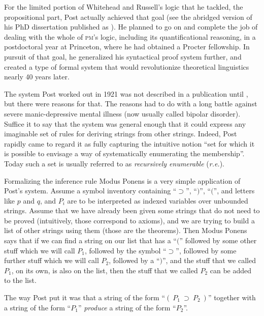 \documentclass[output=paper]{langscibook}
\begin{document}
For the limited portion of  Whitehead and Russell's logic that he tackled, the propositional part, Post actually achieved that goal (see the abridged version of his PhD dissertation published as \citealt{Post21}). He planned to go on and complete the job of dealing with the whole of \textsc{pm}'s logic, including its quantificational reasoning, in a postdoctoral year at Princeton, where he had obtained a Procter fellowship. In pursuit of that goal, he generalized his syntactical proof system further, and created a type of formal system that would revolutionize theoretical linguistics nearly 40 years later.

The system Post worked out in 1921 was not described in a publication until \citeyear{Post43}, but there were reasons for that. The reasons had to do with a long battle against severe manic-depressive mental illness (now usually called bipolar disorder). Suffice it to say that the system was general enough that it could express any imaginable set of rules for deriving strings from other strings. Indeed, Post rapidly came to regard it as fully capturing the intuitive notion ``set for which it is possible to envisage a way of systematically enumerating the membership''. Today such a set is usually referred to as \emph{recursively enumerable} (\emph{r.e.}).

Formalizing the inference rule Modus Ponens is a very simple application of Post's system. Assume a symbol inventory containing ``$\supset$'', ``$)$'', ``$($'', and letters like $p$ and $q$, and $P_i$ are to be interpreted as indexed variables over unbounded strings.  Assume that we have already been given some strings that do not need to be proved (intuitively, those correspond to axioms), and we are trying to build a list of other strings using them (those are the theorems).  Then Modus Ponens says that if we can find a string on our list that has a ``$($'' followed by some other stuff which we will call $P_1$, followed by the symbol ``$\supset$'', followed by some further stuff which we will call $P_2$, followed by a ``$)$'', and the stuff that we called $P_1$, on its own, is also on the list, then the stuff that we called $P_2$ can be added to the list.

The way Post put it was that a string of the form ``$(\:P_1\:\supset\:P_2\:)$'' together with a string of the form ``$P_1$'' \emph{produce} a string of the form ``$P_2$''.
\end{document}
